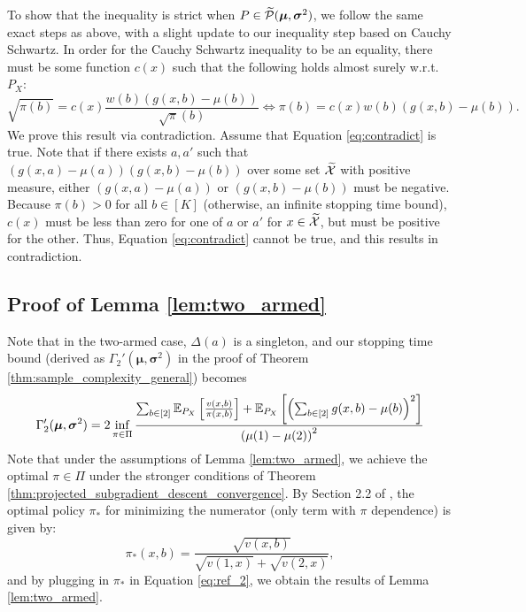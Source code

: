 \documentclass{article}
\begin{document}
\begin{appendices}
To show that the inequality is strict when $P \in \widetilde{\mathcal{P}}(\boldsymbol{\mu}, \boldsymbol{\sigma}^2)$, we follow the same exact steps as above, with a slight update to our inequality step based on Cauchy Schwartz. In order for the Cauchy Schwartz inequality to be an equality, there must be some function $c(x)$ such that the following holds almost surely w.r.t. $P_X$:
\begin{equation}\label{eq:contradict}
    \sqrt{\pi(b)} = c(x)\frac{w(b)(g(x,b) - \mu(b))} {\sqrt{\pi}(b)} \iff \pi(b) = c(x) w(b)(g(x,b)- \mu(b)).
\end{equation}
We prove this result via contradiction. Assume that Equation \eqref{eq:contradict} is true. Note that if there exists $a,a'$ such that $(g(x,a)-\mu(a))(g(x,b)-\mu(b))$ over some set $\widetilde{\mathcal{X}}$ with positive measure, either $(g(x,a)-\mu(a))$ or $(g(x,b)-\mu(b))$ must be negative. Because $\pi(b) > 0$ for all $b \in [K]$ (otherwise, an infinite stopping time bound), $c(x)$ must be less than zero for one of $a$ or $a'$ for $x \in \widetilde{\mathcal{X}}$, but must be positive for the other. Thus, Equation \eqref{eq:contradict} cannot be true, and this results in contradiction. 






\subsection{Proof of Lemma \ref{lem:two_armed}}

Note that in the two-armed case, $\Delta(a)$ is a singleton, and our stopping time bound (derived as $\Gamma_2'(\bm{\mu}, \bm{\sigma}^2)$ in the proof of Theorem \ref{thm:sample_complexity_general}) becomes
\begin{equation}\label{eq:ref_2}
    \Gamma_2'(\boldsymbol{\mu}, \boldsymbol{\sigma}^2) = 2\inf_{\pi \in \Pi} \frac{\sum_{b \in [2]}\mathbb{E}_{P_X}\left[\frac{v(x,b)}{\pi(x,b)}\right] + \mathbb{E}_{P_X}\left[\left(\sum_{b \in [2]}g(x,b)-\mu(b)\right)^2\right]}{\left(\mu(1) -\mu(2)\right)^2} 
\end{equation}
Note that under the assumptions of Lemma \ref{lem:two_armed}, we achieve the optimal $\pi \in \Pi$ under the stronger conditions of Theorem \ref{thm:projected_subgradient_descent_convergence}. By Section 2.2 of \cite{cook2024semiparametricefficientinferenceadaptive}, the optimal policy $\pi_*$ for minimizing the numerator (only term with $\pi$ dependence) is given by:
\begin{equation}
    \pi_*(x,b) = \frac{\sqrt{v(x,b)}}{\sqrt{v(1,x)}+ \sqrt{v(2,x)}},
\end{equation}
and by plugging in $\pi_*$ in Equation \eqref{eq:ref_2}, we obtain the results of Lemma \ref{lem:two_armed}.  



\end{appendices}
\end{document}
